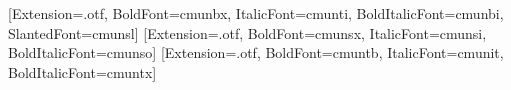 \usepackage[no-math]{fontspec}
\setmainfont{cmunrm}[Extension=.otf, BoldFont=cmunbx, ItalicFont=cmunti, BoldItalicFont=cmunbi, SlantedFont=cmunsl]
\setsansfont{cmunss}[Extension=.otf, BoldFont=cmunsx, ItalicFont=cmunsi, BoldItalicFont=cmunso]
\setmonofont{cmuntt}[Extension=.otf, BoldFont=cmuntb, ItalicFont=cmunit, BoldItalicFont=cmuntx]
\usepackage[english,russian]{babel}
